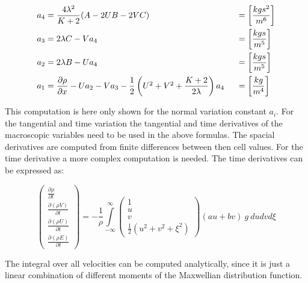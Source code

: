 \documentclass[
	pdftex,             %
	12pt,				%
	a4paper,		   	%
	english,				%
	oneside,			%
]{article}
\begin{document}
\begin{eqnarray}
\begin{split}
\arraycolsep=1.4pt\def\arraystretch{2.2}
\begin{array}{lcll}
a_4 &=& \dfrac{4 \lambda^2}{K+2} ( A - 2 U B - 2 V C )
    & \hspace{0.5cm} = \left[\dfrac{kg s^2}{m^6} \right]
\\
a_3 &=& 2 \lambda C - V a_4
    & \hspace{0.5cm} = \left[\dfrac{kg s}{m^5} \right]
\\
a_2 &=& 2 \lambda B - U a_4
    & \hspace{0.5cm} = \left[\dfrac{kg s}{m^5} \right]
\\
a_1 &=& \dfrac{\partial \rho}{\partial x} - U a_2 - V a_3 - \dfrac{1}{2} \left( U^2 + V^2 + \dfrac{K+2}{2\lambda} \right) a_4
    & \hspace{0.5cm} = \left[\dfrac{kg}{m^4} \right]
\end{array}
\end{split}
\end{eqnarray}

This computation is here only shown for the normal variation constant $a_i$. For the tangential and time variation the tangential and time derivatives of the macroscopic variables need to be used in the above formulas. The spacial derivatives are computed from finite differences between then cell values. For the time derivative a more complex computation is needed. The time derivatives can be expressed as:

\begin{equation}
\begin{pmatrix}
	\frac{\partial \rho    }{\partial t} \\
	\frac{\partial (\rho V)}{\partial t} \\
	\frac{\partial (\rho U)}{\partial t} \\
	\frac{\partial (\rho E)}{\partial t}
\end{pmatrix}
 =
 -\frac{1}{\rho}
\int \limits^{\infty}_{-\infty}
\begin{pmatrix}
	1 \\
	u \\
	v \\
	\frac{1}{2} ( u^2 + v^2 + \xi^2 )
\end{pmatrix}
(a u + b v) ~g~
du dv d\xi
\end{equation}

The integral over all velocities can be computed analytically, since it is just a linear combination of different moments of the Maxwellian distribution function.
\end{document}
